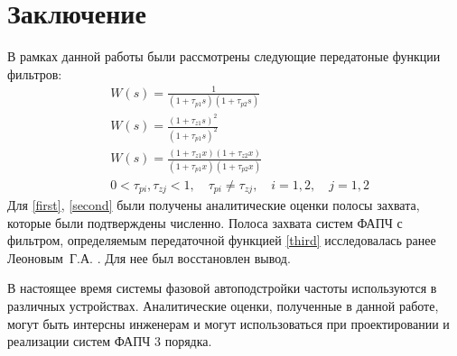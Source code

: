 \documentclass[a4paper,article,14pt]{extarticle}
\begin{document}
\pagebreak
\section{Заключение}
В рамках данной работы были рассмотрены следующие передатоные функции фильтров: 
 \begin{align}
&W(s) = \frac{1}{(1+\tau_{p1}s)(1+\tau_{p2}s)}\label{first}\\[5pt]
&W(s) = \frac{(1+\tau_{z1}s)^2}{(1+\tau_{p1}s)^2}\label{second}\\[5pt]
&W(s) = \frac{(1+\tau_{z1}x)(1+\tau_{z2}x)}{(1+\tau_{p1}x)(1+\tau_{p2}x)}\label{third}\\
&0<\tau_{pi},\tau_{zj} < 1, \quad \tau_{pi} \neq \tau_{zj}, \quad i=1,2, \quad j=1,2
 \end{align}
 Для \eqref{first}, \eqref{second} были получены аналитические оценки полосы захвата, которые были подтверждены численно. Полоса захвата систем ФАПЧ с фильтром, определяемым передаточной функцией \eqref{third} исследовалась ранее Леоновым~Г.\:А. \cite{kuznetsov}. Для нее был восстановлен вывод. 
 
 В настоящее время системы фазовой автоподстройки частоты используются в различных устройствах. Аналитические оценки, полученные в данной работе, могут быть интерсны инженерам и могут использоваться при проектировании и реализации систем ФАПЧ 3 порядка.
 
 \pagebreak
{}







 
\end{document}
